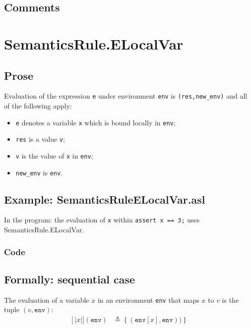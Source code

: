 \documentclass{book}
\newcommand\llbracket{[|}
\newcommand\rrbracket{|]}
\newcommand\interp[1]{\left\llbracket #1 \right\rrbracket}
\begin{document}
  \subsection{Comments}


\section{SemanticsRule.ELocalVar \label{sec:SemanticsRule.ELocalVar}}

  \subsection{Prose}
  Evaluation of the expression \texttt{e} under environment \texttt{env} is
  \texttt{(res,new\_env)} and all of the following apply:
  \begin{itemize}
  \item \texttt{e} denotes a variable \texttt{x} which is bound locally in \texttt{env};
  \item \texttt{res} is a value \texttt{v};
  \item \texttt{v} is the value of \texttt{x} in \texttt{env};
  \item \texttt{new\_env} is \texttt{env}.
  \end{itemize}

  \subsection{Example: SemanticsRuleELocalVar.asl}
    In the program:
    the evaluation of \texttt{x} within \texttt{assert x == 3;} uses SemanticsRule.ELocalVar.

  \subsubsection{Code}

  \subsection{Formally: sequential case}
  The evaluation of a variable $x$ in an environment \texttt{env} that maps $x$ to $v$
  is the tuple $(v,\texttt{env})$: 
  \begin{align}
  \interp{x}(\texttt{env}) & \triangleq \left\{ (\texttt{env}[x], \texttt{env})) \right\}
  \label{eq:sem-seq-var}
  \end{align} 
 
\end{document}
